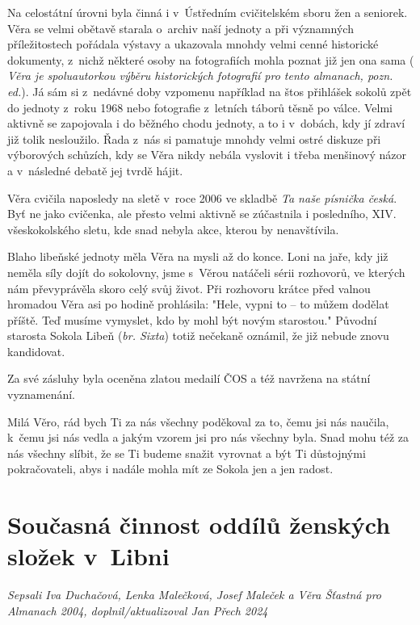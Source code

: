 \documentclass[a5paper, 11pt, twoside]{article}
\newcommand{\pozned}[1]{%
\textit{#1}}
\begin{document}
Na celostátní úrovni byla činná i v~Ústředním cvičitelském sboru žen a
seniorek. Věra se velmi obětavě starala o~archiv naší jednoty a při
významných příležitostech pořádala výstavy a ukazovala mnohdy velmi
cenné historické dokumenty, z~nichž některé osoby na fotografiích mohla
poznat již jen ona sama (\pozned{Věra je spoluautorkou výběru historických
fotografií pro tento almanach, pozn. ed.}). Já sám si z~nedávné doby
vzpomenu například na štos přihlášek sokolů zpět do jednoty z~roku 1968
nebo fotografie z~letních táborů těsně po válce. Velmi aktivně se
zapojovala i do běžného chodu jednoty, a to i v~dobách, kdy jí zdraví
již tolik nesloužilo. Řada z~nás si pamatuje mnohdy velmi ostré diskuze
při výborových schůzích, kdy se Věra nikdy nebála vyslovit i třeba
menšinový názor a v~následné debatě jej tvrdě hájit.

Věra cvičila naposledy na sletě v~roce 2006 ve skladbě \textit{Ta naše
písnička česká}. Byť ne jako cvičenka, ale přesto velmi aktivně se
zúčastnila i posledního, XIV. všeskokolského sletu, kde snad nebyla
akce, kterou by nenavštívila.

Blaho libeňské jednoty měla Věra na mysli až do konce. Loni na jaře, kdy
již neměla síly dojít do sokolovny, jsme s~Věrou natáčeli sérii
rozhovorů, ve kterých nám převyprávěla skoro celý svůj život. Při
rozhovoru krátce před valnou hromadou Věra asi po hodině prohlásila:
"Hele, vypni to -- to můžem dodělat příště. Teď musíme vymyslet, kdo by
mohl být novým starostou." Původní starosta Sokola Libeň (\textit{br.
Sixta}) totiž nečekaně oznámil, že již nebude znovu kandidovat.

Za své zásluhy byla oceněna zlatou medailí ČOS a též navržena na státní
vyznamenání.

Milá Věro, rád bych Ti za nás všechny poděkoval za to, čemu jsi nás
naučila, k~čemu jsi nás vedla a jakým vzorem jsi pro nás všechny byla.
Snad mohu též za nás všechny slíbit, že se Ti budeme snažit vyrovnat a
být Ti důstojnými pokračovateli, abys i nadále mohla mít ze Sokola jen a
jen radost.

 \clearpage
\section{Současná činnost oddílů ženských složek
v~Libni}

\begin{center}
  \textit{Sepsali Iva Duchačová, Lenka Malečková, Josef Maleček a Věra
  Šťastná pro Almanach 2004, doplnil/aktualizoval Jan Přech 2024}
\end{center}
\end{document}
